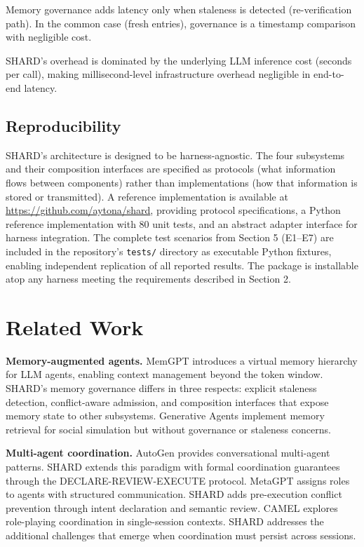 \documentclass[11pt]{article}
\begin{document}
Memory governance adds latency only when staleness is detected (re-verification path). In the common case (fresh entries), governance is a timestamp comparison with negligible cost.

SHARD's overhead is dominated by the underlying LLM inference cost (seconds per call), making millisecond-level infrastructure overhead negligible in end-to-end latency.

\subsection{Reproducibility}

SHARD's architecture is designed to be harness-agnostic. The four subsystems and their composition interfaces are specified as protocols (what information flows between components) rather than implementations (how that information is stored or transmitted). A reference implementation is available at \url{https://github.com/aytona/shard}, providing protocol specifications, a Python reference implementation with 80 unit tests, and an abstract adapter interface for harness integration. The complete test scenarios from Section 5 (E1--E7) are included in the repository's \texttt{tests/} directory as executable Python fixtures, enabling independent replication of all reported results. The package is installable atop any harness meeting the requirements described in Section 2.

\section{Related Work}

\textbf{Memory-augmented agents.} MemGPT \citep{packer2023memgpt} introduces a virtual memory hierarchy for LLM agents, enabling context management beyond the token window. SHARD's memory governance differs in three respects: explicit staleness detection, conflict-aware admission, and composition interfaces that expose memory state to other subsystems. Generative Agents \citep{park2023generative} implement memory retrieval for social simulation but without governance or staleness concerns.

\textbf{Multi-agent coordination.} AutoGen \citep{wu2023autogen} provides conversational multi-agent patterns. SHARD extends this paradigm with formal coordination guarantees through the DECLARE-REVIEW-EXECUTE protocol. MetaGPT \citep{hong2023metagpt} assigns roles to agents with structured communication. SHARD adds pre-execution conflict prevention through intent declaration and semantic review. CAMEL \citep{li2023camel} explores role-playing coordination in single-session contexts. SHARD addresses the additional challenges that emerge when coordination must persist across sessions.
\end{document}
